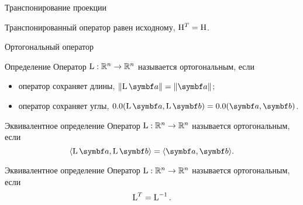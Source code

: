 \begin{frame}{Транспонирование проекции}
\begin{center}

\end{center}




\pause
Транспонированный оператор равен исходному, $\mathrm{H}^T = \mathrm{H}$.



    

\end{frame}






\begin{frame}{Ортогональный оператор}

\begin{block}{Определение}
Оператор $\operatorname{L}: \mathbb{R}^n \to \mathbb{R}^n$ называется \alert{ортогональным}, если
\begin{itemize}
    \item оператор сохраняет длины, $\norm{\LL \ba} = \norm{\ba}$;
    \item оператор сохраняет углы, $\angle(\LL\ba, \LL \bb) = \angle(\ba, \bb)$.
\end{itemize}
\end{block}

\pause

\begin{block}{Эквивалентное определение} 
Оператор $\operatorname{L}: \mathbb{R}^n \to \mathbb{R}^n$ называется \alert{ортогональным}, если
\[
    \langle \LL \ba, \LL \bb\rangle = \langle \ba, \bb \rangle.
\]
\end{block}

\pause

\begin{block}{Эквивалентное определение} 
Оператор $\operatorname{L}: \mathbb{R}^n \to \mathbb{R}^n$ называется \alert{ортогональным}, если
\[
    \operatorname{L}^T = \operatorname{L}^{-1}.
\]
\end{block}


\end{frame}


